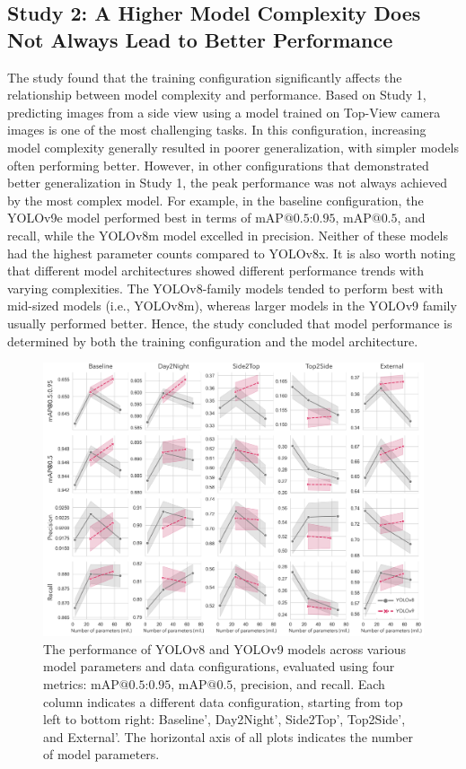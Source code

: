 \subsection{Study 2:  A Higher Model Complexity Does Not Always Lead to Better Performance}
The study found that the training configuration significantly affects the relationship between model complexity and performance. Based on Study 1, predicting images from a side view using a model trained on Top-View camera images is one of the most challenging tasks. In this configuration, increasing model complexity generally resulted in poorer generalization, with simpler models often performing better. However, in other configurations that demonstrated better generalization in Study 1, the peak performance was not always achieved by the most complex model. For example, in the baseline configuration, the YOLOv9e model performed best in terms of $\text{mAP@{0.5:0.95}}$, $\text{mAP@{0.5}}$, and recall, while the YOLOv8m model excelled in precision. Neither of these models had the highest parameter counts compared to YOLOv8x. It is also worth noting that different model architectures showed different performance trends with varying complexities. The YOLOv8-family models tended to perform best with mid-sized models (i.e., YOLOv8m), whereas larger models in the YOLOv9 family usually performed better. Hence, the study concluded that model performance is determined by both the training configuration and the model architecture.
\begin{figure}[!t]
    \centerline{\includegraphics[width=\columnwidth]{figure_4.jpg}}
    \caption{The performance of YOLOv8 and YOLOv9 models across various model parameters and data configurations, evaluated using four metrics: $\text{mAP@{0.5:0.95}}$, $\text{mAP@{0.5}}$, precision, and recall. Each column indicates a different data configuration, starting from top left to bottom right: Baseline', Day2Night', Side2Top', Top2Side', and External'. The horizontal axis of all plots indicates the number of model parameters.}
    \label{fig:models}
\end{figure}
